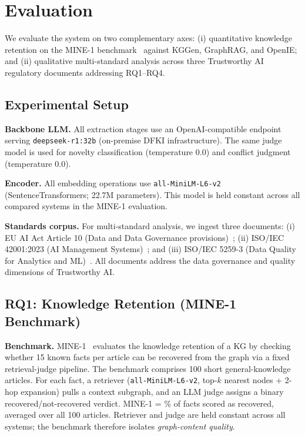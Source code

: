 \section{Evaluation}

We evaluate the system on two complementary axes: (i) quantitative knowledge retention on the MINE-1 benchmark~\citep{mo2025kggen} against KGGen, GraphRAG, and OpenIE; and (ii) qualitative multi-standard analysis across three Trustworthy AI regulatory documents addressing RQ1--RQ4.

\subsection{Experimental Setup}

\textbf{Backbone LLM.} All extraction stages use an OpenAI-compatible endpoint serving \texttt{deepseek-r1:32b} (on-premise DFKI infrastructure). The same judge model is used for novelty classification (temperature 0.0) and conflict judgment (temperature 0.0).

\textbf{Encoder.} All embedding operations use \texttt{all-MiniLM-L6-v2} (SentenceTransformers; 22.7M parameters). This model is held constant across all compared systems in the MINE-1 evaluation.

\textbf{Standards corpus.} For multi-standard analysis, we ingest three documents: (i) EU AI Act Article 10 (Data and Data Governance provisions)~\citep{euAIAct2024}; (ii) ISO/IEC 42001:2023 (AI Management Systems)~\citep{iso42001}; and (iii) ISO/IEC 5259-3 (Data Quality for Analytics and ML)~\citep{iso52593}. All documents address the data governance and quality dimensions of Trustworthy AI.

\subsection{RQ1: Knowledge Retention (MINE-1 Benchmark)}

\textbf{Benchmark.} MINE-1~\citep{mo2025kggen} evaluates the knowledge retention of a KG by checking whether 15 known facts per article can be recovered from the graph via a fixed retrieval-judge pipeline. The benchmark comprises 100 short general-knowledge articles. For each fact, a retriever (\texttt{all-MiniLM-L6-v2}, top-$k$ nearest nodes + 2-hop expansion) pulls a context subgraph, and an LLM judge assigns a binary recovered/not-recovered verdict. MINE-1 = \% of facts scored as recovered, averaged over all 100 articles. Retriever and judge are held constant across all systems; the benchmark therefore isolates \emph{graph-content quality}.

